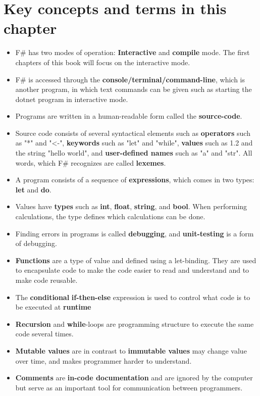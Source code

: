\documentclass[fsharpNotes.tex]{subfiles}
\begin{document}
\section{Key concepts and terms in this chapter}
\begin{itemize}
\item F\# has two modes of operation: \textbf{Interactive} and \textbf{compile} mode. The first chapters of this book will focus on the interactive mode. 
\item F\# is accessed through the \textbf{console/terminal/command-line}, which is another program, in which text commands can be given such as starting the dotnet program in interactive mode.
\item Programs are written in a human-readable form called the \textbf{source-code}.
\item Source code consists of several syntactical elements such as \textbf{operators} such as "*" and "<-", \textbf{keywords} such as "let" and "while", \textbf{values} such as 1.2 and the string "hello world", and \textbf{user-defined names} such as "a" and "str". All words, which F\# recognizes are called \textbf{lexemes}.
\item A program consists of a sequence of \textbf{expressions}, which comes in two types: \textbf{let} and \textbf{do}.
\item Values have \textbf{types} such as \textbf{int}, \textbf{float}, \textbf{string}, and \textbf{bool}. When performing calculations, the type defines which calculations can be done.
\item Finding errors in programs is called \textbf{debugging}, and \textbf{unit-testing} is a form of debugging. 
\item \textbf{Functions} are a type of value and defined using a let-binding. They are used to encapsulate code to make the code easier to read and understand and to make code reusable.
\item The \textbf{conditional} \textbf{if-then-else} expression is used to control what code is to be executed at \textbf{runtime}
\item \textbf{Recursion} and \textbf{while}-loops are programming structure to execute the same code several times.
\item \textbf{Mutable values} are in contrast to \textbf{immutable values} may change value over time, and makes programmer harder to understand.
\item \textbf{Comments} are \textbf{in-code documentation} and are ignored by the computer but serve as an important tool for communication between programmers.
\end{itemize}
\end{document}
